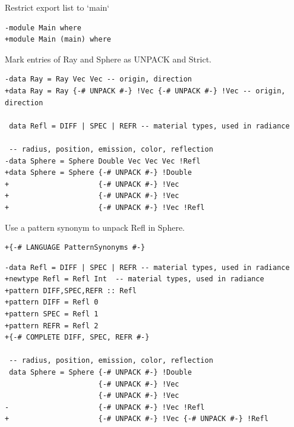 \documentclass[8pt]{beamer}
\begin{document}
\begin{frame}[fragile]{Restrict export list to `main`}
\begin{verbatim}
-module Main where
+module Main (main) where
\end{verbatim}
\end{frame}

\begin{frame}[fragile]{Mark entries of Ray and Sphere as UNPACK and Strict.}

\begin{verbatim}
-data Ray = Ray Vec Vec -- origin, direction
+data Ray = Ray {-# UNPACK #-} !Vec {-# UNPACK #-} !Vec -- origin, direction

 data Refl = DIFF | SPEC | REFR -- material types, used in radiance

 -- radius, position, emission, color, reflection
-data Sphere = Sphere Double Vec Vec Vec !Refl
+data Sphere = Sphere {-# UNPACK #-} !Double 
+                     {-# UNPACK #-} !Vec 
+                     {-# UNPACK #-} !Vec 
+                     {-# UNPACK #-} !Vec !Refl
\end{verbatim}
\end{frame}


\begin{frame}[fragile]{Use a pattern synonym to unpack Refl in Sphere.}

\begin{verbatim}
+{-# LANGUAGE PatternSynonyms #-}
\end{verbatim}


\begin{verbatim}
-data Refl = DIFF | SPEC | REFR -- material types, used in radiance
+newtype Refl = Refl Int  -- material types, used in radiance
+pattern DIFF,SPEC,REFR :: Refl
+pattern DIFF = Refl 0
+pattern SPEC = Refl 1
+pattern REFR = Refl 2
+{-# COMPLETE DIFF, SPEC, REFR #-}

 -- radius, position, emission, color, reflection
 data Sphere = Sphere {-# UNPACK #-} !Double 
                      {-# UNPACK #-} !Vec
                      {-# UNPACK #-} !Vec 
-                     {-# UNPACK #-} !Vec !Refl
+                     {-# UNPACK #-} !Vec {-# UNPACK #-} !Refl

 \end{verbatim}
\end{frame}
\end{document}
